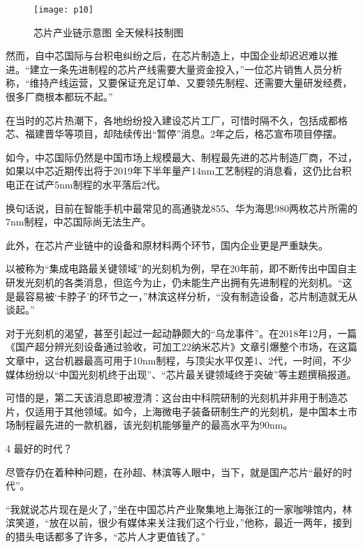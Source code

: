 \documentclass[utf8]{book}
\begin{document}
		\begin{figure}[H]
		\centering
		\texttt{[image: p10]}
		\caption{芯片产业链示意图 全天候科技制图}
		\end{figure}
	
	
	
	然而，自中芯国际与台积电纠纷之后，在芯片制造上，中国企业却迟迟难以推进。“建立一条先进制程的芯片产线需要大量资金投入，”一位芯片销售人员分析称，“维持产线运营，又要保证充足订单、又要领先制程、还需要大量研发经费，很多厂商根本都玩不起。”
	
	在当时的芯片热潮下，各地纷纷投入建设芯片工厂，可惜时隔不久，包括成都格芯、福建晋华等项目，却陆续传出“暂停”消息。2年之后，格芯宣布项目停摆。
	
	如今，中芯国际仍然是中国市场上规模最大、制程最先进的芯片制造厂商，不过，如果以中芯近期传出将于2019年下半年量产14nm工艺制程的消息看，这仍比台积电正在试产5nm制程的水平落后2代。
	
	换句话说，目前在智能手机中最常见的高通骁龙855、华为海思980两枚芯片所需的7nm制程，中芯国际尚无法生产。
	
	此外，在芯片产业链中的设备和原材料两个环节，国内企业更是严重缺失。
	
	以被称为“集成电路最关键领域”的光刻机为例，早在20年前，即不断传出中国自主研发光刻机的各类消息，但迄今为止，仍未能生产出拥有先进制程的光刻机。“这是最容易被‘卡脖子’的环节之一，”林滨这样分析，“没有制造设备，芯片制造就无从谈起。”
	
	对于光刻机的渴望，甚至引起过一起动静颇大的“乌龙事件”。在2018年12月，一篇《国产超分辨光刻设备通过验收，可加工22纳米芯片》文章引爆整个市场，在这篇文章中，这台机器最高可用于10nm制程，与顶尖水平仅差1、2代，一时间，不少媒体纷纷以“中国光刻机终于出现”、“芯片最关键领域终于突破”等主题撰稿报道。
	
	可惜的是，第二天该消息即被澄清：这台由中科院研制的光刻机并非用于制造芯片，仅适用于其他领域。如今，上海微电子装备研制生产的光刻机，是中国本土市场制程最先进的一款机器，该光刻机能够量产的最高水平为90nm。
	
	
	\begin{flushleft}
		{\Large 4 最好的时代？}
	\end{flushleft}
	
	
	
	尽管存仍在着种种问题，在孙超、林滨等人眼中，当下，就是国产芯片“最好的时代”。
	
	“我就说芯片现在是火了，”坐在中国芯片产业聚集地上海张江的一家咖啡馆内，林滨笑道，“放在以前，很少有媒体来关注我们这个行业，”他称，最近一两年，接到的猎头电话都多了许多，“芯片人才更值钱了。”
	
\end{document}
